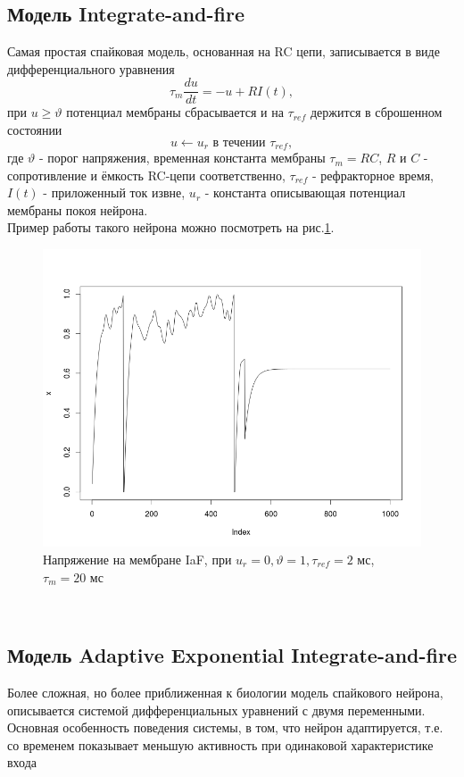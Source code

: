 \documentclass[a4paper,10pt,usenames]{article}
\begin{document}
\subsection{Модель Integrate-and-fire}
\indent Самая простая спайковая модель, основанная на RC цепи, записывается в виде дифференциального уравнения
   \begin{equation}\label{eq:iaf}
   \tau_{m}\frac{du}{dt} =-u+R I(t),
   \end{equation}
при $u \geq \vartheta$ потенциал мембраны сбрасывается и на $\tau_{ref}$ держится в сброшенном состоянии
   \begin{equation}\label{eq:iaf_reset}
   u \leftarrow u_{r} \mbox{ в течении }\tau_{ref}, 
   \end{equation}
   где $\vartheta$ - порог напряжения, временная константа мембраны $\tau_{m}=RC$, $R$ и $C$ - сопротивление и ёмкость RC-цепи соответственно, $\tau_{ref}$ - рефракторное время, $I(t)$ - приложенный ток извне, $u_{r}$ - константа описывающая потенциал мембраны покоя нейрона.\\
   \indent Пример работы такого нейрона можно посмотреть на рис.\ref{iaf_neuron_pic}.\\
\begin{figure}[ht]
\centering
\captionsetup{justification=centering,margin=1cm}
\includegraphics[width=120mm,scale=1]{iaf_profile.png}
\caption{Напряжение на мембране IaF, при $u_{r} = 0, \vartheta = 1, \tau_{ref} = 2$ мс, $\tau_{m} = 20$ мс}
\label{iaf_neuron_pic}
\end{figure}\\
\subsection{Модель Adaptive Exponential Integrate-and-fire}
\indent Более сложная, но более приближенная к биологии модель спайкового нейрона, описывается системой дифференциальных уравнений с двумя переменными. Основная особенность поведения системы, в том, что нейрон адаптируется, т.е. со временем показывает меньшую активность при одинаковой характеристике входа
\end{document}
